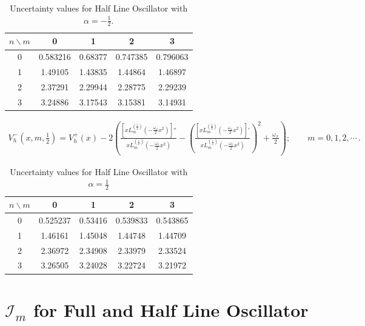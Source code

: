 \documentclass[12pt]{article}
\begin{document}
\begin{table}[h!]
\centering
\begin{tabular}{c|c|c|c|c}
\hline
$n \backslash m$ & 0     & 1       & 2       & 3       \\ \hline
0 & 0.583216 & 0.68377  & 0.747385 & 0.796063 \\
1 & 1.49105  & 1.43835  & 1.44864  & 1.46897  \\
2 & 2.37291  & 2.29944  & 2.28775  & 2.29239  \\
3 & 3.24886  & 3.17543  & 3.15381  & 3.14931  \\ \hline
\end{tabular}
\caption{Uncertainty values for Half Line Oscillator with $\alpha = -\tfrac{1}{2}$.}
\label{tab:uncertainty_halfl}
\end{table}


\begin{align}\label{HLO:V-alpha+}\nonumber
V_h^-(x, m, \frac{1}{2}) = V_h^+(x) - 2\left( \frac{\left[x L_m^{(\frac{1}{2})}\left(-\frac{\omega_x}{2} x^2\right)\right]''}{x L_m^{(\frac{1}{2})}\left(-\frac{\omega_x}{2} x^2\right)} - \left( \frac{\left[x L_m^{(\frac{1}{2})}\left(-\frac{\omega_x}{2} x^2\right)\right]'}{x L_m^{(\frac{1}{2})}\left(-\frac{\omega_x}{2} x^2\right)} \right)^2 + \frac{\omega_x}{2} \right); \qquad m = 0,1,2,\cdots \,.
\end{align}


\begin{table}[h!]
\centering
\begin{tabular}{c|c|c|c|c}
\hline
$n \backslash m$ & 0 & 1 & 2 & 3 \\ \hline
0 & 0.525237 & 0.53416  & 0.539833 & 0.543865 \\
1 & 1.46161  & 1.45048  & 1.44748  & 1.44709  \\
2 & 2.36972  & 2.34908  & 2.33979  & 2.33524  \\
3 & 3.26505  & 3.24028  & 3.22724  & 3.21972  \\ \hline
\end{tabular}
\caption{Uncertainty values for Half Line Oscillator with $\alpha = \tfrac{1}{2}$}
\label{tab:uncertainty_halfline_m123}
\end{table}


\newpage
\section*{$\mathcal{I}_m$ for Full and Half Line Oscillator}
\end{document}
